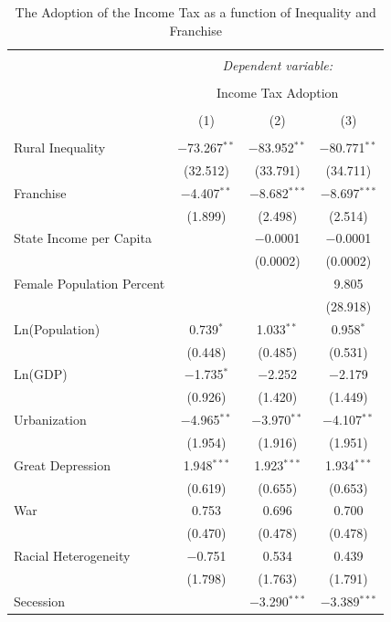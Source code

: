\documentclass[letter, 12pt]{article}
\begin{document}
\begin{table}[!htbp] \centering 
	\caption{The Adoption of the Income Tax as a function of Inequality and Franchise} 
	\label{} 
	\begin{tabular}{@{\extracolsep{5pt}}lccc} 
		\\[-1.8ex]\hline 
		\hline \\[-1.8ex] 
		& \multicolumn{3}{c}{\textit{Dependent variable:}} \\ 
		\cline{2-4} 
		\\[-1.8ex] & \multicolumn{3}{c}{Income Tax Adoption} \\ 
		\\[-1.8ex] & (1) & (2) & (3)\\ 
		\hline \\[-1.8ex] 
		Rural Inequality & $-$73.267$^{**}$ & $-$83.952$^{**}$ & $-$80.771$^{**}$ \\ 
		& (32.512) & (33.791) & (34.711) \\ 
		Franchise & $-$4.407$^{**}$ & $-$8.682$^{***}$ & $-$8.697$^{***}$ \\ 
		& (1.899) & (2.498) & (2.514) \\ 
		State Income per Capita &  & $-$0.0001 & $-$0.0001 \\ 
		&  & (0.0002) & (0.0002) \\ 
		Female Population Percent &  &  & 9.805 \\ 
		&  &  & (28.918) \\ 
		Ln(Population) & 0.739$^{*}$ & 1.033$^{**}$ & 0.958$^{*}$ \\ 
		& (0.448) & (0.485) & (0.531) \\ 
		Ln(GDP) & $-$1.735$^{*}$ & $-$2.252 & $-$2.179 \\ 
		& (0.926) & (1.420) & (1.449) \\ 
		Urbanization & $-$4.965$^{**}$ & $-$3.970$^{**}$ & $-$4.107$^{**}$ \\ 
		& (1.954) & (1.916) & (1.951) \\ 
		Great Depression & 1.948$^{***}$ & 1.923$^{***}$ & 1.934$^{***}$ \\ 
		& (0.619) & (0.655) & (0.653) \\ 
		War & 0.753 & 0.696 & 0.700 \\ 
		& (0.470) & (0.478) & (0.478) \\ 
		Racial Heterogeneity & $-$0.751 & 0.534 & 0.439 \\ 
		& (1.798) & (1.763) & (1.791) \\ 
		Secession &  & $-$3.290$^{***}$ & $-$3.389$^{***}$ \\ 

\end{tabular}
\end{table}
\end{document}
